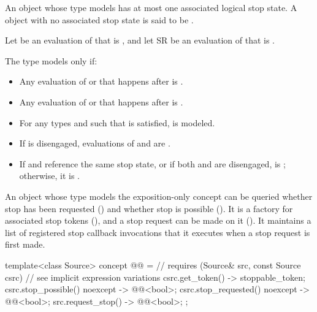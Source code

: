 \pnum
An object whose type models 
has at most one associated logical stop state.
A  object with no associated stop state
is said to be .

\pnum
Let  be an evaluation of 
that is , and
let SR be an evaluation of  that is .

\pnum
The type  models  only if:
\begin{itemize}
\item
Any evaluation of  or 
that happens after  is .
\item
Any evaluation of  or 
that happens after  is .
\item
For any types  and  such that
is satisfied,
is modeled.
\item
If  is disengaged,
evaluations of  and 
are .
\item
If  and  reference the same stop state, or
if both  and  are disengaged,
 is ; otherwise, it is .
\end{itemize}

\pnum
An object
whose type models the exposition-only  concept
can be queried
whether stop has been requested () and
whether stop is possible ().
It is a factory for associated stop tokens (), and
a stop request can be made on it ().
It maintains a list of registered stop callback invocations
that it executes when a stop request is first made.
\begin{codeblock}
template<class Source>
  concept @@ =                                    // \expos
    requires (Source& src, const Source csrc) {         // see implicit expression variations
      { csrc.get_token() } -> stoppable_token;
      { csrc.stop_possible() } noexcept -> @@<bool>;
      { csrc.stop_requested() } noexcept -> @@<bool>;
      { src.request_stop() } -> @@<bool>;
    };
\end{codeblock}

